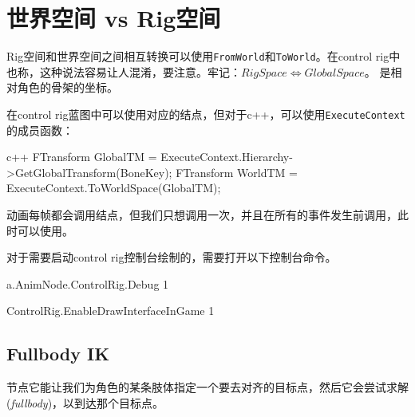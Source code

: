 \documentclass[math,code,12pt]{amznotes}
\newcommand{\il}[1]{\texttt{#1}}%
\begin{document}

		\mainmatter{}
		\chapter{世界空间 vs Rig空间}
		Rig空间和世界空间之间相互转换可以使用\il{FromWorld}和\il{ToWorld}。在control rig中也称，这种说法容易让人混淆，要注意。牢记：$Rig Space \iff Global Space$。		是相对角色的骨架的坐标。
		
		在control rig蓝图中可以使用对应的结点，但对于c++，可以使用\il{ExecuteContext}的成员函数：
		\begin{amzcode}{c++}
		FTransform GlobalTM = ExecuteContext.Hierarchy->GetGlobalTransform(BoneKey);
		FTransform WorldTM = ExecuteContext.ToWorldSpace(GlobalTM);
		\end{amzcode}
		
		动画每帧都会调用结点，但我们只想调用一次，并且在所有的事件发生前调用，此时可以使用。
		
		对于需要启动control rig控制台绘制的，需要打开以下控制台命令。
		\begin{console}
		a.AnimNode.ControlRig.Debug 1
		
		ControlRig.EnableDrawInterfaceInGame 1
		\end{console}
		\section{Fullbody IK}
		 节点它能让我们为角色的某条肢体指定一个要去对齐的目标点，然后它会尝试求解(\emph{fullbody})，以到达那个目标点。
		
\end{document}
